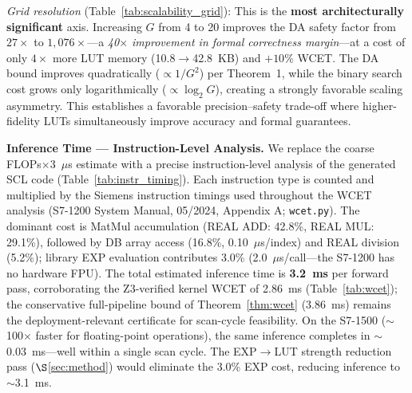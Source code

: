 \documentclass[journal,onecolumn]{IEEEtran}
\begin{document}
\textit{Grid resolution} (Table~\ref{tab:scalability_grid}): This is the
\textbf{most architecturally significant} axis. Increasing $G$ from 4 to 20
improves the DA safety factor from $27\times$ to $1{,}076\times$---a
\textit{40$\times$ improvement in formal correctness margin}---at a cost of
only $4\times$ more LUT memory (10.8$\to$42.8~KB) and $+10\%$ WCET. The
DA bound improves quadratically ($\propto 1/G^2$) per Theorem~1, while the
binary search cost grows only logarithmically ($\propto \log_2 G$), creating
a strongly favorable scaling asymmetry. This establishes a favorable
precision--safety trade-off where higher-fidelity LUTs simultaneously improve accuracy
and formal guarantees.%

\noindent\textbf{Inference Time --- Instruction-Level Analysis.} We replace the
coarse FLOPs$\times$3~$\mu$s estimate with a precise instruction-level analysis
of the generated SCL code (Table~\ref{tab:instr_timing}). Each instruction
type is counted and multiplied by the Siemens instruction timings used
throughout the WCET analysis (S7-1200 System Manual, 05/2024, Appendix A;
\texttt{wcet.py}). The dominant cost is MatMul accumulation
(REAL ADD: 42.8\%, REAL MUL: 29.1\%), followed by DB
array access (16.8\%, 0.10~$\mu$s/index) and REAL division (5.2\%); library
EXP evaluation contributes 3.0\% (2.0~$\mu$s/call---the S7-1200 has no
hardware FPU). The total estimated inference time is \textbf{3.2~ms} per
forward pass, corroborating the Z3-verified kernel WCET of 2.86~ms
(Table~\ref{tab:wcet}); the conservative full-pipeline bound of
Theorem~\ref{thm:wcet} (3.86~ms) remains the deployment-relevant
certificate for scan-cycle feasibility. On the S7-1500 ($\sim$100$\times$ faster
for floating-point operations), the same inference completes in
$\sim$0.03~ms---well within a single scan cycle. The EXP$\to$LUT strength
reduction pass ($\S$\ref{sec:method}) would eliminate the 3.0\% EXP cost,
reducing inference to $\sim$3.1~ms.
\end{document}

